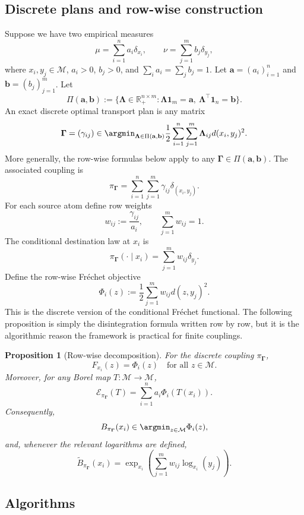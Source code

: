 \documentclass[10pt]{article} %
\newtheorem{proposition}[proposition]{Proposition}
\theoremstyle{definition}
\providecommand{\R}{\mathbb{R}}
\providecommand{\1}{\mathbf{1}}
\providecommand{\sM}{\mathcal{M}}
\providecommand{\va}{\mathbf{a}}
\providecommand{\vb}{\mathbf{b}}
\providecommand{\vone}{\mathbf{1}}
\providecommand{\mGamma}{\boldsymbol{\Gamma}}
\providecommand{\mLambda}{\boldsymbol{\Lambda}}
\begin{document}
\subsection{Discrete plans and row-wise construction}

Suppose we have two empirical measures
\[
\mu=\sum_{i=1}^n a_i\delta_{x_i},
\qquad
\nu=\sum_{j=1}^m b_j\delta_{y_j},
\]
where $x_i,y_j\in\sM$, $a_i>0$, $b_j>0$, and $\sum_i a_i=\sum_j b_j=1$. Let $\va=(a_i)_{i=1}^n$ and $\vb=(b_j)_{j=1}^m$. Let
\[
\Pi(\va,\vb):=\{\mLambda\in\R_+^{n\times m}:\mLambda\vone_m=\va,\ \mLambda^\top\vone_n=\vb\}.
\]
An exact discrete optimal transport plan is any matrix
\[
\mGamma=(\gamma_{ij})\in\argmin_{\mLambda\in\Pi(\va,\vb)}
\frac12\sum_{i=1}^n\sum_{j=1}^m\mLambda_{ij}d(x_i,y_j)^2.
\]
More generally, the row-wise formulas below apply to any $\mGamma\in\Pi(\va,\vb)$. The associated coupling is
\[
\pi_{\mGamma}=\sum_{i=1}^n\sum_{j=1}^m\gamma_{ij}\delta_{(x_i,y_j)}.
\]
For each source atom define row weights
\[
w_{ij}:=\frac{\gamma_{ij}}{a_i},
\qquad
\sum_{j=1}^m w_{ij}=1.
\]
The conditional destination law at $x_i$ is
\[
\pi_{\mGamma}(\cdot\mid x_i)=\sum_{j=1}^m w_{ij}\delta_{y_j}.
\]
Define the row-wise Fr\'echet objective
\[
\Phi_i(z):=\frac12\sum_{j=1}^m w_{ij}d(z,y_j)^2.
\]
This is the discrete version of the conditional Fr\'echet functional. The following proposition is simply the disintegration formula written row by row, but it is the algorithmic reason the framework is practical for finite couplings.

\begin{proposition}[Row-wise decomposition]
\label{prop:rowwise_decomposition}
For the discrete coupling $\pi_{\mGamma}$,
\[
F_{x_i}(z)=\Phi_i(z)
\quad\text{for all }z\in\sM.
\]
Moreover, for any Borel map $T:\sM\to\sM$,
\[
\mathcal E_{\pi_{\mGamma}}(T)=\sum_{i=1}^n a_i\Phi_i(T(x_i)).
\]
Consequently,
\[
B_{\pi_{\mGamma}}(x_i)\in\argmin_{z\in\sM}\Phi_i(z),
\]
and, whenever the relevant logarithms are defined,
\[
\widetilde B_{\pi_{\mGamma}}(x_i)
=
\exp_{x_i}\left(\sum_{j=1}^m w_{ij}\log_{x_i}(y_j)\right).
\]
\end{proposition}



\subsection{Algorithms}
\end{document}

